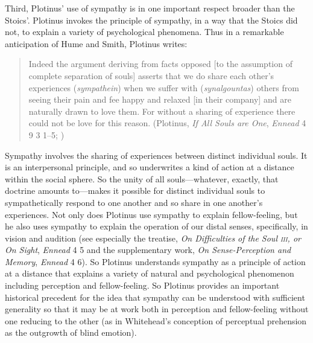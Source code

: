 Third, Plotinus' use of sympathy is in one important respect broader than the Stoics'. Plotinus invokes the principle of sympathy, in a way that the Stoics did not, to explain a variety of psychological phenomena. Thus in a remarkable anticipation of Hume and Smith, Plotinus writes:
\begin{quote}
	Indeed the argument deriving from facts opposed [to the assumption of complete separation of souls] asserts that we do share each other's experiences (\emph{sympathein}) when we suffer with (\emph{synalgountas}) others from seeing their pain and fee happy and relaxed [in their company] and are naturally drawn to love them. For without a sharing of experience there could not be love for this reason. (Plotinus, \emph{If All Souls are One}, \emph{Ennead} 4 9 3 1--5; \citealt[433--5]{Armstrong:1984aa})
\end{quote}
Sympathy involves the sharing of experiences between distinct individual souls. It is an interpersonal principle, and so underwrites a kind of action at a distance within the social sphere. So the unity of all souls---whatever, exactly, that doctrine amounts to---makes it possible for distinct individual souls to sympathetically respond to one another and so share in one another's experiences. Not only does Plotinus use sympathy to explain fellow-feeling, but he also uses sympathy to explain the operation of our distal senses, specifically, in vision and audition (see especially the treatise, \emph{On Difficulties of the Soul \textsc{iii}, or On Sight}, \emph{Ennead} 4 5 and the supplementary work, \emph{On Sense-Perception and Memory}, \emph{Ennead} 4 6). So Plotinus understands sympathy as a principle of action at a distance that explains a variety of natural and psychological phenomenon including perception and fellow-feeling. So Plotinus provides an important historical precedent for the idea that sympathy can be understood with sufficient generality so that it may be at work both in perception and fellow-feeling without one reducing to the other (as in Whitehead's \citeyear{Whitehead:1978zr} conception of perceptual prehension as the outgrowth of blind emotion).


